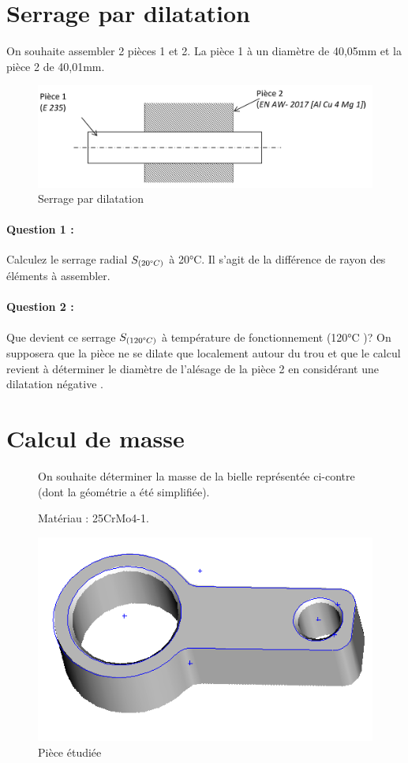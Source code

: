 

\section{Serrage par dilatation}

On souhaite assembler 2 pièces 1 et 2. La pièce 1 à un diamètre de 40,05mm et la pièce 2 de 40,01mm. 

\begin{figure}[!h]
  \centering\includegraphics[width=0.7\linewidth]{img/assemblage.png}
  \caption{Serrage par dilatation}
  \label{img:image1}
\end{figure}

\paragraph{Question 1 :} Calculez le serrage radial $S_{(20\degree C)}$ à 20°C. Il s'agit de la différence de rayon des éléments à assembler.

\paragraph{Question 2 :} Que devient ce serrage $S_{(120\degree C)}$ à température de fonctionnement (120°C )? On supposera que la pièce ne se dilate que localement autour du trou et que le calcul revient à déterminer le diamètre de l'alésage de la pièce 2 en considérant une \og dilatation négative \fg.
 
\section{Calcul de masse}

\begin{figure}[!h]
 \begin{minipage}{0.6\linewidth}
On souhaite déterminer la masse de la bielle représentée ci-contre (dont la géométrie a été simplifiée). 
 
Matériau : 25CrMo4-1. 
 \end{minipage}
\hfill
 \begin{minipage}{0.35\linewidth}
  \centering\includegraphics[width=0.7\linewidth]{img/piece1.png}
  \caption{Pièce étudiée}
  \label{img:image2}
 \end{minipage}
\end{figure}
 
